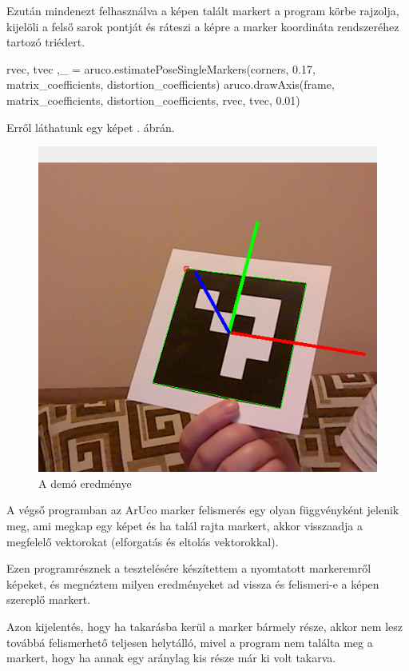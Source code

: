 Ezután  mindenezt felhasználva a képen talált markert a program  körbe rajzolja, kijelöli a felső sarok pontját és ráteszi a képre a marker koordináta rendszeréhez tartozó triédert.
\begin{python}
rvec, tvec ,_ = aruco.estimatePoseSingleMarkers(corners,
0.17, matrix_coefficients, distortion_coefficients)
aruco.drawAxis(frame, matrix_coefficients, distortion_coefficients,
rvec, tvec, 0.01)
\end{python}
Erről láthatunk egy képet . ábrán.
\begin{figure}[htp]
    \centering
   	\includegraphics[scale=0.6]{images/felismeres_aruco.png}
	\caption{A demó eredménye}
	\label{fig:felismeres_aruco}
\end{figure}


A végső programban az ArUco marker felismerés egy olyan függvényként jelenik meg, ami megkap egy képet és ha talál rajta markert, akkor visszaadja a megfelelő vektorokat (elforgatás és eltolás vektorokkal).

Ezen programrésznek a tesztelésére készítettem a nyomtatott markeremről képeket, és megnéztem milyen eredményeket ad vissza és felismeri-e a képen szereplő markert.

Azon kijelentés, hogy ha takarásba kerül a marker bármely része, akkor nem lesz továbbá felismerhető teljesen helytálló, mivel a program nem találta meg a markert, hogy ha annak egy aránylag kis része már ki volt takarva.

